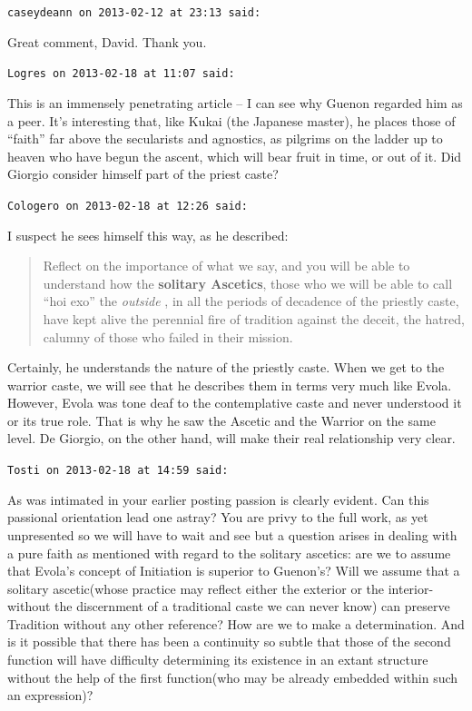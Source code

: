 \begin{footnotesize}
\begin{sffamily}
\hfill

\texttt{caseydeann on 2013-02-12 at 23:13 said:}

Great comment, David. Thank you.

\texttt{Logres on 2013-02-18 at 11:07 said:}

This is an immensely penetrating article -- I can see why Guenon regarded him as a peer. It's interesting that, like Kukai (the Japanese master), he places those of ``faith'' far above the secularists and agnostics, as pilgrims on the ladder up to heaven who have begun the ascent, which will bear fruit in time, or out of it. Did Giorgio consider himself part of the priest caste?

\hfill

\texttt{Cologero on 2013-02-18 at 12:26 said:}

I suspect he sees himself this way, as he described:

\begin{quote}

Reflect on the importance of what we say, and you will be able to understand how the \textbf{solitary Ascetics}, those who we will be able to call ``hoi exo'' the \emph{outside} , in all the periods of decadence of the priestly caste, have kept alive the perennial fire of tradition against the deceit, the hatred, calumny of those who failed in their mission.
\end{quote}


Certainly, he understands the nature of the priestly caste. When we get to the warrior caste, we will see that he describes them in terms very much like Evola. However, Evola was tone deaf to the contemplative caste and never understood it or its true role. That is why he saw the Ascetic and the Warrior on the same level. De Giorgio, on the other hand, will make their real relationship very clear.

\hfill

\texttt{Tosti on 2013-02-18 at 14:59 said:}

As was intimated in your earlier posting passion is clearly evident. Can this passional orientation lead one astray? You are privy to the full work, as yet unpresented so we will have to wait and see but a question arises in dealing with a pure faith as mentioned with regard to the solitary ascetics: are we to assume that Evola's concept of Initiation is superior to Guenon's? Will we assume that a solitary ascetic(whose practice may reflect either the exterior or the interior-without the discernment of a traditional caste we can never know) can preserve Tradition without any other reference? How are we to make a determination. And is it possible that there has been a continuity so subtle that those of the second function will have difficulty determining its existence in an extant structure without the help of the first function(who may be already embedded within such an expression)?


\end{sffamily}
\end{footnotesize}
